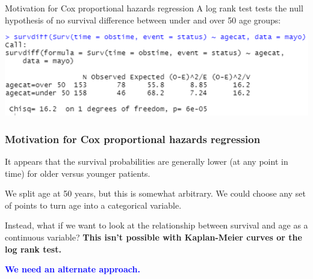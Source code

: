 \documentclass[10pt,t]{beamer}
\begin{document}
\begin{frame}{Motivation for Cox proportional hazards regression}
	A log rank test tests the null hypothesis of no survival difference between under and over 50 age groups:
	\begin{center}
		\includegraphics[width = \textwidth]{figs/logrank_agecat.png}
	\end{center}
\end{frame}

\begin{frame}
	\frametitle{Motivation for Cox proportional hazards regression}
	
	It appears that the survival probabilities are generally lower (at any point in time) for older versus younger patients. 
	\bigskip 
	
	We split age at 50 years, but this is somewhat arbitrary. We could choose any set of points to turn age into a categorical variable.
	\bigskip
	
	Instead, what if we want to look at the relationship between survival and age as a continuous variable? \textbf{This isn't possible with Kaplan-Meier curves or the log rank test.}
	
	\bigskip
	
	\textbf{\textcolor{blue}{We need an alternate approach.}}
	
\end{frame}
\end{document}
